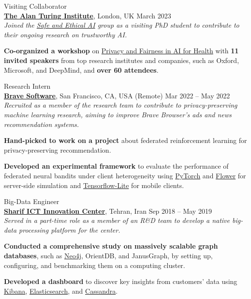 \documentclass[11pt]{article}
\begin{document}
\begin{outerlist}
	\item {Visiting Collaborator}\\ 
	\textbf{\href{https://www.turing.ac.uk/}{The Alan Turing Institute}}, London, UK \hfill {March 2023}\\
  \textit{Joined the \href{https://www.turing.ac.uk/research/research-programmes/artificial-intelligence-ai/safe-and-ethical}{Safe and Ethical AI} group as a visiting PhD student to contribute to their ongoing research on trustworthy AI.}
	\begin{innerlist}
		\item \textbf{Co-organized a workshop} on \href{https://private-fair-ai.github.io/}{Privacy and Fairness in AI for Health} with \textbf{11 invited speakers} from top research institutes and companies, such as {Oxford}, {Microsoft}, and {DeepMind}, and \textbf{over 60 attendees}.
	\end{innerlist}

	\item {Research Intern}\\
	\textbf{\href{https://brave.com/}{Brave Software}}, San Francisco, CA, USA (Remote) \hfill {Mar 2022 -- May 2022}\\
  \textit{Recruited as a member of the research team to contribute to privacy-preserving machine learning research, aiming to improve Brave Browser's ads and news recommendation systems.}
	\begin{innerlist}
		\item \textbf{Hand-picked to work on a project} about federated reinforcement learning for privacy-preserving recommendation.
		\item \textbf{Developed an experimental framework} to evaluate the performance of federated neural bandits under client heterogeneity using \href{https://pytorch.org/}{PyTorch} and \href{https://flower.dev/}{Flower} for server-side simulation and \href{https://www.tensorflow.org/lite}{Tensorflow-Lite} for mobile clients.
	\end{innerlist}


	\item {Big-Data Engineer} \\
	\href{http://ictic.sharif.ir}{\textbf{Sharif ICT Innovation Center}}, Tehran, Iran \hfill {Sep 2018 -- May 2019}\\
  \textit{Served in a part-time role as a member of an R\&D team to develop a native big-data processing platform for the center.}
	\begin{innerlist}
		\item \textbf{Conducted a comprehensive study on massively scalable graph databases}, such as \href{https://neo4j.com/}{Neo4j}, OrientDB, and JanusGraph, by setting up, configuring, and benchmarking them on a computing cluster.
		\item \textbf{Developed a dashboard} to discover key insights from customers' data using \href{https://www.elastic.co/kibana}{Kibana}, \href{https://www.elastic.co/elasticsearch/}{Elasticsearch}, and \href{https://cassandra.apache.org/}{Cassandra}.
	\end{innerlist}



\end{outerlist}
\end{document}
